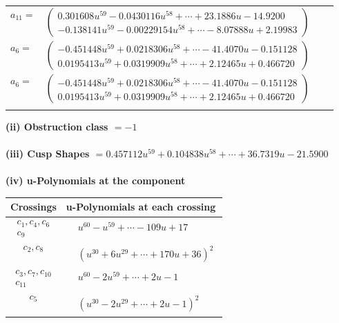 \documentclass[1p]{elsarticle_modified}
\theoremstyle{definition}
\begin{document}
\begin{tabular}{m{7pt} m{180pt} m{7pt} m{180pt} }
\flushright $a_{11}=$&$\begin{pmatrix}0.301608 u^{59}-0.0430116 u^{58}+\cdots+23.1886 u-14.9200\\-0.138141 u^{59}-0.00229154 u^{58}+\cdots-8.07888 u+2.19983\end{pmatrix}$ \\
\flushright $a_{6}=$&$\begin{pmatrix}-0.451448 u^{59}+0.0218306 u^{58}+\cdots-41.4070 u-0.151128\\0.0195413 u^{59}+0.0319909 u^{58}+\cdots+2.12465 u+0.466720\end{pmatrix}$\\ \flushright $a_{6}=$&$\begin{pmatrix}-0.451448 u^{59}+0.0218306 u^{58}+\cdots-41.4070 u-0.151128\\0.0195413 u^{59}+0.0319909 u^{58}+\cdots+2.12465 u+0.466720\end{pmatrix}$\\&\end{tabular}
\flushleft \textbf{(ii) Obstruction class $= -1$}\\~\\
\flushleft \textbf{(iii) Cusp Shapes $= 0.457112 u^{59}+0.104838 u^{58}+\cdots+36.7319 u-21.5900$}\\~\\
\newpage\renewcommand{\arraystretch}{1}
\flushleft \textbf{(iv) u-Polynomials at the component}\newline \\
\begin{tabular}{m{50pt}|m{274pt}}
Crossings & \hspace{64pt}u-Polynomials at each crossing \\
\hline $$\begin{aligned}c_{1},c_{4},c_{6}\\c_{9}\end{aligned}$$&$\begin{aligned}
&u^{60}- u^{59}+\cdots-109 u+17
\end{aligned}$\\
\hline $$\begin{aligned}c_{2},c_{8}\end{aligned}$$&$\begin{aligned}
&(u^{30}+6 u^{29}+\cdots+170 u+36)^{2}
\end{aligned}$\\
\hline $$\begin{aligned}c_{3},c_{7},c_{10}\\c_{11}\end{aligned}$$&$\begin{aligned}
&u^{60}-2 u^{59}+\cdots+2 u-1
\end{aligned}$\\
\hline $$\begin{aligned}c_{5}\end{aligned}$$&$\begin{aligned}
&(u^{30}-2 u^{29}+\cdots+2 u-1)^{2}
\end{aligned}$\\
\hline
\end{tabular}\\~\\
\end{document}
